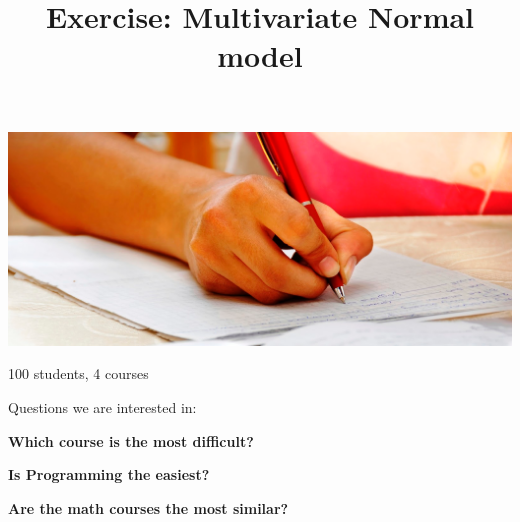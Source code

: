 



\title[Multivariate Normal]{Exercise: Multivariate Normal model}



\begin{frame}
\begin{analysis}

\smallskip

\begin{minipage}[c]{0.33\linewidth}

\begin{center}
\includegraphics[width=1.0\linewidth]{../LectureAssets/L04/exam}
\end{center}

\begin{tiny}

\bigskip

100 students, 4 courses

\bigskip

\bigskip

Questions we are interested in:

\bigskip

\textbf{Which course is the most difficult?}

\bigskip

\textbf{Is Programming the easiest?}

\bigskip

\textbf{Are the math courses the most similar?}

\bigskip

\end{tiny}

\end{minipage} 
\begin{minipage}[c]{0.65\linewidth}


\end{minipage}
\end{analysis}
\end{frame}
